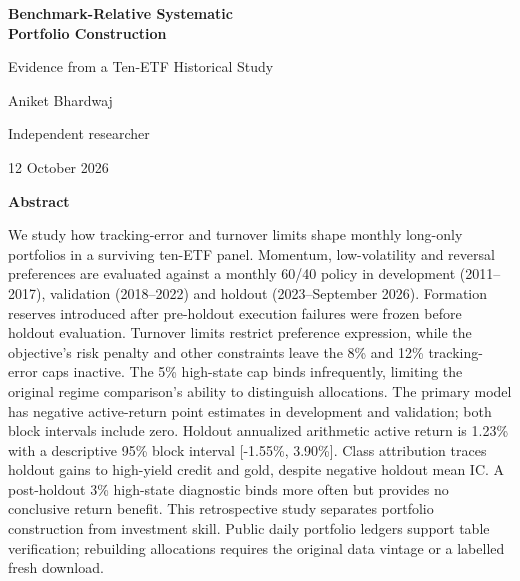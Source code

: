 \documentclass[11pt,a4paper]{article}
\renewenvironment{abstract}{\par\vspace{12pt}\noindent\textbf{Abstract}\par\vspace{4pt}\small\setstretch{1.08}}{\par\normalsize\vspace{10pt}}
\begin{document}
\begin{titlepage}
\thispagestyle{empty}
\begin{center}
\vspace*{8mm}
{\fontsize{22}{26}\selectfont\bfseries Benchmark-Relative Systematic\\[3pt]Portfolio Construction}\par
\vspace{4mm}
{\large Evidence from a Ten-ETF Historical Study}\par
\vspace{9mm}
{\large Aniket Bhardwaj}\par
\vspace{2mm}
{\small Independent researcher}\par
\vspace{4mm}
{\small 12 October 2026}\par
\end{center}
\vspace{5mm}
\begin{abstract}
We study how tracking-error and turnover limits shape monthly long-only
portfolios in a surviving ten-ETF panel. Momentum, low-volatility and reversal
preferences are evaluated against a monthly 60/40 policy in development
(2011--2017), validation (2018--2022) and holdout (2023--September 2026).
Formation reserves introduced after pre-holdout execution failures were frozen
before holdout evaluation. Turnover limits restrict preference expression,
while the objective's risk penalty and other constraints leave the 8\% and
12\% tracking-error caps inactive. The 5\% high-state cap binds infrequently,
limiting the original regime comparison's ability to distinguish allocations.
The primary model has negative active-return point estimates in development
and validation; both block intervals include zero.
Holdout annualized arithmetic active return is 1.23\% with a descriptive 95\% block interval [-1.55\%, 3.90\%].
Class attribution traces holdout gains to high-yield credit and gold, despite negative holdout mean IC. A post-holdout 3\% high-state diagnostic binds more often but provides no conclusive return benefit.
This retrospective study separates portfolio construction from investment
skill. Public daily portfolio ledgers support table verification; rebuilding
allocations requires the original data vintage or a labelled fresh download.
\end{abstract}
\par
\vfill
{}\par
\end{titlepage}
\setcounter{page}{1}
\end{document}

